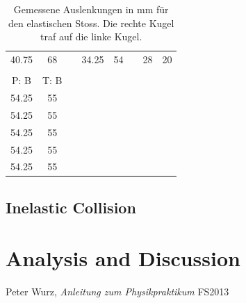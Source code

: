 \documentclass{scrreprt}
\renewcommand{\emph}[1]{\textit{#1}}
\begin{document}
\begin{table}[H]
\begin{tabular}{ccp{1.5cm}ccp{1.5cm}rl}
     40.75 &         68 &            &      34.25 &         54 &            &         28 &         20 \\

           &            &            &            &            &            &            &            \\

 P: B &   T: B &            &            &            &            &            &            \\\cline{1-2}

     54.25 &         55 &            &            &            &            &            &            \\

     54.25 &         55 &            &            &            &            &            &            \\

     54.25 &         55 &            &            &            &            &            &            \\

     54.25 &         55 &            &            &            &            &            &            \\

     54.25 &         55 &            &            &            &            &            &            \\
\end{tabular}  
\caption{Gemessene Auslenkungen in mm für den elastischen Stoss. Die rechte Kugel traf auf die linke Kugel.}  
\end{table}
\subsection{Inelastic Collision}

\section{Analysis and Discussion}


\begin{thebibliography}{9}

  Peter Wurz,
  \emph{Anleitung zum Physikpraktikum}
  FS2013

\end{thebibliography}
\end{document}
